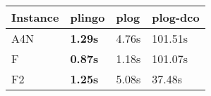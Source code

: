 \begin{tabular}{|l|l|l|l|}
\toprule
\textbf{Instance} & \textbf{plingo} & \textbf{plog} & \textbf{plog-dco} \\
\midrule
              A4N &  \textbf{1.29s} &         4.76s &           101.51s \\
                F &  \textbf{0.87s} &         1.18s &           101.07s \\
               F2 &  \textbf{1.25s} &         5.08s &            37.48s \\
\bottomrule
\end{tabular}
